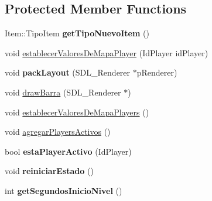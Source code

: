 \subsection*{Protected Member Functions}
\begin{DoxyCompactItemize}
\item 
Item\+::\+Tipo\+Item {\bfseries get\+Tipo\+Nuevo\+Item} ()\hypertarget{class_juego_af4734fcef83b06c0a8cfa0ba2a2bc0a7}{}\label{class_juego_af4734fcef83b06c0a8cfa0ba2a2bc0a7}

\item 
void \hyperlink{class_juego_a95af6c1b23ede35e0714e1d01ff7c570}{establecer\+Valores\+De\+Mapa\+Player} (Id\+Player id\+Player)
\item 
void {\bfseries pack\+Layout} (S\+D\+L\+\_\+\+Renderer $\ast$p\+Renderer)\hypertarget{class_juego_a51f2b9d3c31036521eff299b29d98685}{}\label{class_juego_a51f2b9d3c31036521eff299b29d98685}

\item 
void \hyperlink{class_juego_a46d94040c73103aa385d64361717d55c}{draw\+Barra} (S\+D\+L\+\_\+\+Renderer $\ast$)
\item 
void \hyperlink{class_juego_ac40dabed8ef689479cede0b7aa346ce8}{establecer\+Valores\+De\+Mapa\+Players} ()
\item 
void \hyperlink{class_juego_ac4832a99f849b8180667cfda4a2493e3}{agregar\+Players\+Activos} ()
\item 
bool {\bfseries esta\+Player\+Activo} (Id\+Player)\hypertarget{class_juego_a9511541ec77f0dcb380df6f2f49f52e2}{}\label{class_juego_a9511541ec77f0dcb380df6f2f49f52e2}

\item 
void {\bfseries reiniciar\+Estado} ()\hypertarget{class_juego_a0f2054b23552adc7898f67ea4547a980}{}\label{class_juego_a0f2054b23552adc7898f67ea4547a980}

\item 
int {\bfseries get\+Segundos\+Inicio\+Nivel} ()\hypertarget{class_juego_a55223ce1f280cbeff8443196b3334069}{}\label{class_juego_a55223ce1f280cbeff8443196b3334069}

\end{DoxyCompactItemize}
